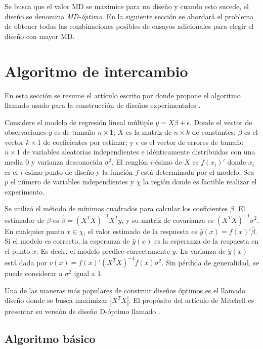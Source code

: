 Se busca que el valor MD se maximice para un diseño y cuando esto sucede, el diseño se denomina \textit{MD-óptimo}. En la siguiente sección se abordará el problema de obtener todas las combinaciones posibles de ensayos adicionales para elegir el diseño con mayor MD. 


\section{Algoritmo de intercambio} \label{sec_algInterca}
En esta sección se resume el artículo escrito por \cite{mitchelldetmax} donde propone el algoritmo llamado  usado para la construcción de diseños experimentales . 

Considere el modelo de regresión lineal múltiple $y = X \beta + \epsilon$. Donde el vector de observaciones $y$ es de tamaño $n \times 1$; $X$ es la matriz de $n \times k$ de constantes; $\beta$ es el vector $k \times 1$ de coeficientes por estimar; y $\epsilon$ es el vector de errores de tamaño $n \times 1$ de variables aleatorias independientes e idénticamente distribuidas con una media $0$ y varianza desconocida $\sigma^{2}$. El renglón $i$-ésimo de $X$ es $f(x_i)'$ donde $x_i$ es el $i$-ésimo punto de diseño y la función $f$ está determinada por el modelo. Sea $p$ el número de variables independientes y $\chi$ la región donde es factible realizar el experimento.

Se utilizó el método de mínimos cuadrados para calcular los coeficientes $\beta$. El estimador de $\beta$ es $\hat{\beta} = (X^{T}X)^{-1} X^{T}y$, y su matriz de covarianza es $(X^{T}X)^{-1} \sigma^{2}$. En cualquier punto $x \in \chi$, el valor estimado de la  respuesta es $\hat{y} (x) = f(x)' \hat{\beta}$. Si el modelo es correcto, la esperanza de $\hat{y}(x)$ es la esperanza de la respuesta en el punto $x$. Es decir, el modelo predice correctamente $y$. La varianza de $\hat{y}(x)$ está dada por $v(x) = f(x)' (X^{T}X)^{-1} f(x) \sigma^{2}$. Sin pérdida de generalidad, se puede considerar a $\sigma^{2}$ igual a $1$. 

Una de las maneras más populares de construir diseños óptimos es el llamado diseño  donde se busca maximizar $|X^{T}X|$. El propósito del artículo de Mitchell es presentar su versión de diseño D-óptimo llamado . 

\subsection{Algoritmo básico}

